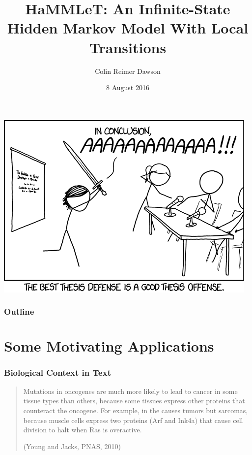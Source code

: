 \documentclass[11pt, mathserif, handout, table]{beamer}
\title{HaMMLeT: An Infinite-State Hidden Markov Model With Local Transitions}
\author{Colin Reimer Dawson}
\date{8 August 2016}
\begin{document}
\frame{\titlepage}

\begin{frame}
  \includegraphics[width=\textwidth]{img/defense.png}
\end{frame}

\begin{frame}
  \frametitle{Outline}
  \tableofcontents
\end{frame}


\section{Some Motivating Applications}
\begin{frame}
  \frametitle{Biological Context in Text}
  \begin{exampleblock}{\small
  \begin{quote}
    Mutations in oncogenes are much more likely to lead to cancer in
    some tissue types than others, because some tissues express other 
    proteins that counteract the oncogene.  For example, in {\color{solarred}{MICE}} the 
    {\color{solargreen}{G12D activating mutation in K-ras}} causes
    {\color{solarorange}{lung}} tumors but {\color{solarorange}{not 
    muscle-derived}} sarcomas, because muscle cells express two proteins 
    (Arf and Ink4a) that cause cell division to halt when Ras is
    overactive.        

    \vspace{0.2in}
    (Young and Jacks, PNAS, 2010)
  \end{quote}
}
\end{exampleblock}
\end{frame}
\end{document}

